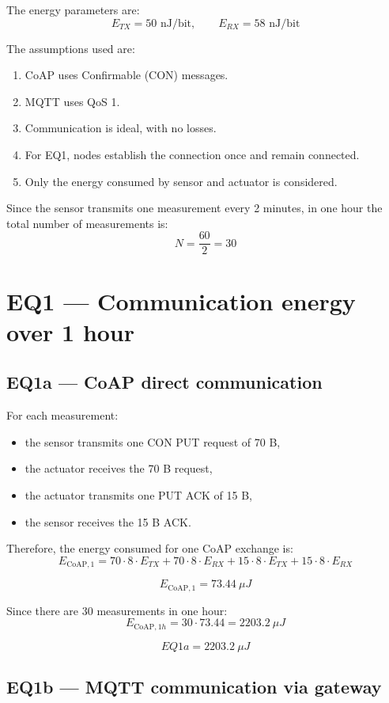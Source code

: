 \documentclass[a4paper,12pt]{article}
\begin{document}
The energy parameters are:
\[
E_{TX} = 50 \text{ nJ/bit}, \qquad E_{RX} = 58 \text{ nJ/bit}
\]

The assumptions used are:
\begin{enumerate}[leftmargin=1.5cm]
    \item CoAP uses Confirmable (CON) messages.
    \item MQTT uses QoS 1.
    \item Communication is ideal, with no losses.
    \item For EQ1, nodes establish the connection once and remain connected.
    \item Only the energy consumed by sensor and actuator is considered.
\end{enumerate}

Since the sensor transmits one measurement every 2 minutes, in one hour the total number of measurements is:
\[
N = \frac{60}{2} = 30
\]

\section{EQ1 --- Communication energy over 1 hour}

\subsection{EQ1a --- CoAP direct communication}

For each measurement:
\begin{itemize}[leftmargin=1.5cm]
    \item the sensor transmits one CON PUT request of 70 B,
    \item the actuator receives the 70 B request,
    \item the actuator transmits one PUT ACK of 15 B,
    \item the sensor receives the 15 B ACK.
\end{itemize}

Therefore, the energy consumed for one CoAP exchange is:
\[
E_{\text{CoAP},1} =
70 \cdot 8 \cdot E_{TX}
+ 70 \cdot 8 \cdot E_{RX}
+ 15 \cdot 8 \cdot E_{TX}
+ 15 \cdot 8 \cdot E_{RX}
\]

\[
E_{\text{CoAP},1} = 73.44 \ \mu J
\]

Since there are 30 measurements in one hour:
\[
E_{\text{CoAP},1h} = 30 \cdot 73.44 = 2203.2 \ \mu J
\]

\[
\boxed{EQ1a = 2203.2 \ \mu J}
\]

\subsection{EQ1b --- MQTT communication via gateway}
\end{document}

